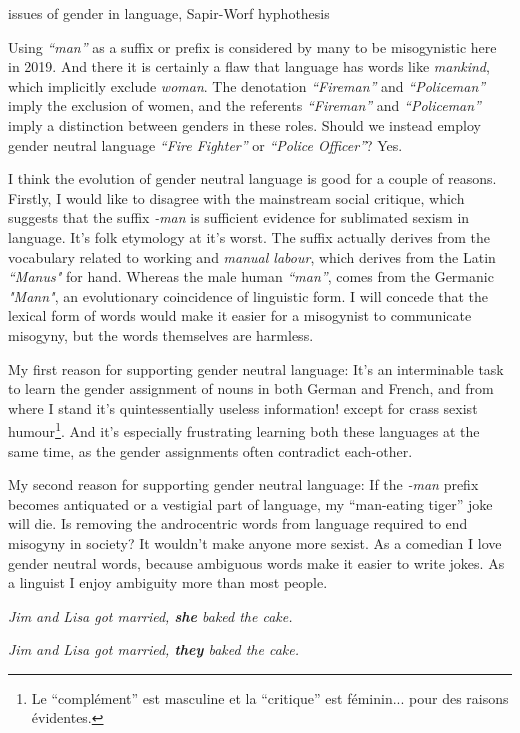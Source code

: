 issues of gender in language, Sapir-Worf hyphothesis

Using \textit{``man''} as a suffix or prefix is considered by many to be misogynistic here in 2019. And there it is certainly a flaw that language has words like \textit{mankind}, which implicitly exclude \textit{woman}. The denotation \textit{``Fireman''} and \textit{``Policeman''} imply the exclusion of women, and the referents \textit{``Fireman''} and \textit{``Policeman''} imply a distinction between genders in these roles. Should we instead employ gender neutral language \textit{``Fire Fighter''} or \textit{``Police Officer''}? Yes.

I think the evolution of gender neutral language is good for a couple of reasons. Firstly, I would like to disagree with the mainstream social critique, which suggests that the suffix \textit{-man} is sufficient evidence for sublimated sexism in language. It's folk etymology at it's worst. The suffix actually derives from the vocabulary related to working and \textit{manual labour}, which derives from the Latin \textit{``Manus"} for hand. Whereas the male human \textit{``man''}, comes from the Germanic \textit{"Mann"}, an evolutionary coincidence of linguistic form. I will concede that the lexical form of words would make it easier for a misogynist to communicate misogyny, but the words themselves are harmless.

My first reason for supporting gender neutral language: It's an interminable task to learn the gender assignment of nouns in both German and French, and from where I stand it's quintessentially useless information! except for crass sexist humour\footnote{Le ``compl\'{e}ment'' est masculine et la ``critique'' est f\'{e}minin... pour des raisons \'{e}videntes.}. And it's especially frustrating learning both these languages at the same time, as the gender assignments often contradict each-other.

My second reason for supporting gender neutral language: If the \textit{-man} prefix becomes antiquated or a vestigial part of language, my ``man-eating tiger'' joke will die. Is removing the androcentric words from language required to end misogyny in society? It wouldn't make anyone more sexist. As a comedian I love gender neutral words, because ambiguous words make it easier to write jokes. As a linguist I enjoy ambiguity more than most people.

\textit{Jim and Lisa got married, \textbf{she} baked the cake.}

\textit{Jim and Lisa got married, \textbf{they} baked the cake.}

